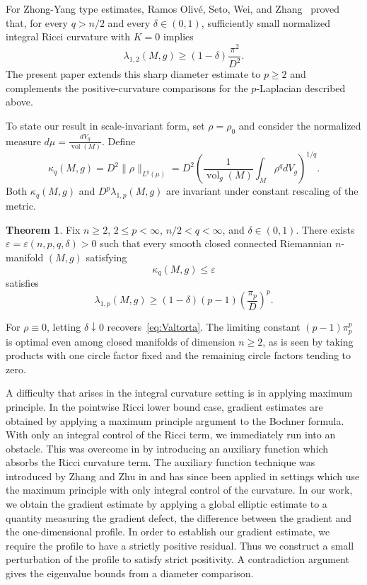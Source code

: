 \documentclass[11pt]{amsart}
\DeclareMathOperator{\vol}{vol}
\DeclareMathOperator{\Vol}{vol}
\theoremstyle{definition}
\newtheorem{theorem}{Theorem}[section]
\begin{document}
 For Zhong-Yang type estimates, Ramos Oliv\'e, Seto, Wei, and Zhang~\cite{RamosSetoWeiZhang2020} proved that, for every $q>n/2$ and every $\delta\in(0,1)$, sufficiently small normalized integral Ricci curvature with $K=0$ implies
\[
 \lambda_{1,2}(M,g)\ge(1-\delta)\frac{\pi^2}{D^2}.
\]
 The present paper extends this sharp diameter estimate to $p\ge2$ and complements the positive-curvature comparisons for the $p$-Laplacian described above.

To state our result in scale-invariant form, set $\rho=\rho_0$ and consider the normalized measure $d\mu = \frac{dV_g}{\vol(M)}.$
Define
\begin{equation}\label{eq:kappa}
 \kappa_q(M,g)=D^2\|\rho\|_{L^q(\mu)}
 =D^2\left(\frac{1}{\Vol_g(M)}\int_M\rho^q  dV_g\right)^{1/q}.
\end{equation}
Both $\kappa_q(M,g)$ and $D^p\lambda_{1,p}(M,g)$ are invariant under constant rescaling of the metric.


\begin{theorem}\label{thm:main}
Fix $n\ge2$, $2\le p<\infty$, $n/2<q<\infty$, and $\delta\in(0,1)$. There exists $\varepsilon=\varepsilon(n,p,q,\delta)>0$ such that every smooth closed connected Riemannian $n$-manifold $(M,g)$ satisfying
\[
 \kappa_q(M,g)\le\varepsilon
\]
satisfies
\begin{equation}\label{eq:main}
 \lambda_{1,p}(M,g)\ge(1-\delta)(p-1)
                  \left(\frac{\pi_p}{D}\right)^p.
\end{equation}
\end{theorem}

 For $\rho\equiv0$, letting $\delta\downarrow0$ recovers~\eqref{eq:Valtorta}. The limiting constant $(p-1)\pi_p^p$ is optimal even among closed manifolds of dimension $n\ge2$, as is seen by taking products with one circle factor fixed and the remaining circle factors tending to zero. 

A difficulty that arises in the integral curvature setting is in applying maximum principle.  In the pointwise Ricci lower bound case, gradient estimates are obtained by applying a maximum principle argument to the Bochner formula.  With only an integral control of the Ricci term, we immediately run into an obstacle.  This was overcome in \cite{RamosSetoWeiZhang2020} by introducing an auxiliary function which absorbs the Ricci curvature term.  The auxiliary function technique was introduced by Zhang and Zhu in \cite{ZhangZhu2017} and has since been applied in settings which use the maximum principle with only integral control of the curvature.   In our work, we obtain the gradient estimate by applying a global elliptic estimate to a quantity measuring the gradient defect, the difference between the gradient and the one-dimensional profile. In order to establish our gradient estimate, we require the profile to have a strictly positive residual.  Thus we construct a small perturbation of the profile to satisfy strict positivity. A contradiction argument gives the eigenvalue bounds from a diameter comparison.
\end{document}
